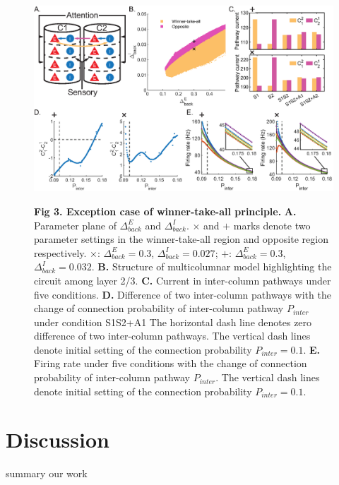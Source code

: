 \documentclass[10pt,letterpaper]{article}
\begin{document}
\begin{figure}[!h]
\begin{adjustwidth}{-2in}{0.3in} %
\centering
\includegraphics{Figure3.eps}
\begin{flushleft} {\bf Fig 3. Exception case of winner-take-all principle.}
\textbf{A.} Parameter plane of $\Delta_{back}^{E}$ and $\Delta_{back}^{I}$. $\times$ and $+$ marks denote two parameter settings in the winner-take-all region and opposite region respectively. $\times$: $\Delta_{back}^{E}=0.3$, $\Delta_{back}^{I}=0.027$; $+$: $\Delta_{back}^{E}=0.3$, $\Delta_{back}^{I}=0.032$. \textbf{B.} Structure of multicolumnar model highlighting the circuit among layer 2/3. \textbf{C.} Current in inter-column pathways under five conditions. \textbf{D.} Difference of two inter-column pathways with the change of connection probability of inter-column pathway $P_{inter}$ under condition S1S2+A1 The horizontal dash line denotes zero difference of two inter-column pathways. The vertical dash lines denote initial setting of the connection probability $P_{inter}=0.1$. \textbf{E.} Firing rate under five conditions with the change of connection probability of inter-column pathway $P_{inter}$. The vertical dash lines denote initial setting of the connection probability $P_{inter}=0.1$.
\end{flushleft}
\hypertarget{fig:fig3}{}
\end{adjustwidth}
\end{figure}

\section*{Discussion}
summary our work
\end{document}
